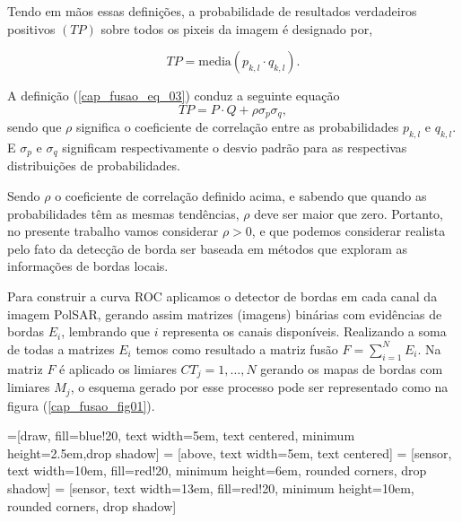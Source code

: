 Tendo em mãos essas definições, a probabilidade de resultados verdadeiros positivos $(TP)$ sobre todos os pixeis da imagem é designado por,

\begin{equation}\label{cap_fusao_eq_03}
TP=\text{media}(p_{k,l}\cdot q_{k,l}).
\end{equation}

A definição (\ref{cap_fusao_eq_03}) conduz a seguinte equação  
\begin{equation}\label{cap_fusao_eq_04}
TP=P \cdot Q + \rho \sigma_p \sigma_q,
\end{equation}
sendo que $\rho$ significa o coeficiente de  correlação entre as probabilidades $p_{k,l}$ e $q_{k,l}$. E $\sigma_p$ e $\sigma_q$ significam respectivamente o desvio padrão para as respectivas distribuições de probabilidades.

Sendo $\rho$ o coeficiente de correlação definido acima, e sabendo que quando as probabilidades têm as mesmas tendências, $\rho$ deve ser maior que zero. Portanto, no presente trabalho vamos considerar $\rho > 0$, e que podemos considerar realista pelo fato da detecção de borda ser baseada em métodos que exploram as informações de bordas locais.

Para construir a curva ROC aplicamos o detector de bordas em cada canal da imagem PolSAR, gerando assim matrizes (imagens) binárias com evidências de bordas $E_i$, lembrando que $i$ representa os canais disponíveis. Realizando a soma de todas a matrizes $E_i$ temos como resultado a matriz fusão $F=\sum_{i=1}^{N}E_i$. Na matriz $F$ é aplicado os limiares $CT_j=1,\dots,N$ gerando os mapas de bordas com limiares $M_j$, o esquema gerado por esse processo pode ser representado como na figura (\ref{cap_fusao_fig01}).

=[draw, fill=blue!20, text width=5em, 
    text centered, minimum height=2.5em,drop shadow]
 = [above, text width=5em, text centered]
 = [sensor, text width=10em, fill=red!20, 
    minimum height=6em, rounded corners, drop shadow]
 = [sensor, text width=13em, fill=red!20, 
    minimum height=10em, rounded corners, drop shadow]
\def\blockdist{2.3}
\def\edgedist{2.5}

